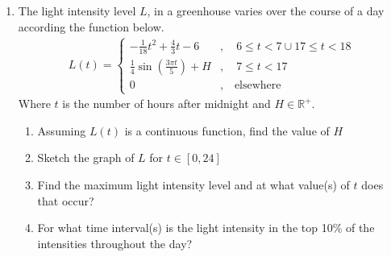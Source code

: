 \documentclass[12pt]{article}
\begin{document}
\begin{enumerate}
    Where $t$ is the number of hours after midnight and $m \in \mathbb{R}$ 
    \begin{enumerate}
        \item What is the value of $m$?
        \item Sketch the graph of $C$ for $t \in [0,24]$
        \item What is the minimum concentration of insects and at what value(s) of $t$ does that occur?
        \item The insect infestation is considered deadly if the concentration is more than 1250 insects per square metre. At what time after midnight does the concentration of insects first stop being deadly?
        \item During a 24 hour periiod, what is the total length of time for which the insect infestation is not deadly?
        \item Due to the uneven surface of the gorge, the time, $T$ minutes, it takes to run $x$ km is given by $T = p(q^{x} -1)$ where $p$ and $q$ are constants. 
        \begin{enumerate}
            \item If it takes 5 minutes to run the first kilometre and 12.5 mins to run the first two kilometres, find the values of $p$ and $q$
            \item Find the length of time it takes to run 4km into the gorge to retrieve a buried treasure
            \item It takes 19 minutes to dig up the treasure and you are able to run back out of the gorge in half the time it takes to reach the treasure. Show that it is possible to recover the treasure successfully and state how much time there will be to spare.
        \end{enumerate}
    \end{enumerate}
    
    \item The light intensity level $L$, in a greenhouse varies over the course of a day according the function below.
    \begin{align*}
    L(t) = \begin{cases} -\frac{1}{18}t^2 + \frac{4}{3}t - 6 & , \quad 6 \le t < 7 \cup 17 \le t < 18 \\ \frac{1}{4} \sin \left( \frac{3\pi t}{5} \right) + H & , \quad 7 \le t < 17 \\ 0 & , \quad \text{elsewhere} \end{cases}
    \end{align*}
    Where $t$ is the number of hours after midnight and $H \in \mathbb{R}^{+}$.
    \begin{enumerate}
        \item Assuming $L(t)$ is a continuous function, find the value of $H$
        \item Sketch the graph of $L$ for $t \in [0,24]$
        \item Find the maximum light intensity level and at what value(s) of $t$ does that occur?
        \item For what time interval(s) is the light intensity in the top 10\% of the intensities throughout the day?
    \end{enumerate}


\end{enumerate}
\end{document}
